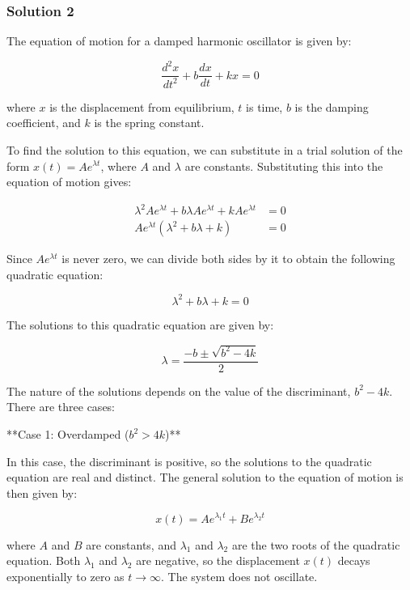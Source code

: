 \documentclass{article}
\begin{document}
\subsubsection{Solution 2}
The equation of motion for a damped harmonic oscillator is given by:

\begin{equation*}
\frac{d^2x}{dt^2} + b\frac{dx}{dt} + kx = 0
\end{equation*}

where $x$ is the displacement from equilibrium, $t$ is time, $b$ is the damping coefficient, and $k$ is the spring constant.

To find the solution to this equation, we can substitute in a trial solution of the form $x(t) = Ae^{\lambda t}$, where $A$ and $\lambda$ are constants. Substituting this into the equation of motion gives:

\begin{align*}
\lambda^2 Ae^{\lambda t} + b \lambda Ae^{\lambda t} + kAe^{\lambda t} &= 0 \\
Ae^{\lambda t}(\lambda^2 + b\lambda + k) &= 0
\end{align*}

Since $Ae^{\lambda t}$ is never zero, we can divide both sides by it to obtain the following quadratic equation:

\begin{equation*}
\lambda^2 + b\lambda + k = 0
\end{equation*}

The solutions to this quadratic equation are given by:

\begin{equation*}
\lambda = \frac{-b \pm \sqrt{b^2 - 4k}}{2}
\end{equation*}

The nature of the solutions depends on the value of the discriminant, $b^2 - 4k$. There are three cases:

**Case 1: Overdamped ($b^2 > 4k$)**

In this case, the discriminant is positive, so the solutions to the quadratic equation are real and distinct. The general solution to the equation of motion is then given by:

\begin{equation*}
x(t) = Ae^{\lambda_1 t} + Be^{\lambda_2 t}
\end{equation*}

where $A$ and $B$ are constants, and $\lambda_1$ and $\lambda_2$ are the two roots of the quadratic equation. Both $\lambda_1$ and $\lambda_2$ are negative, so the displacement $x(t)$ decays exponentially to zero as $t \to \infty$. The system does not oscillate.
\end{document}
